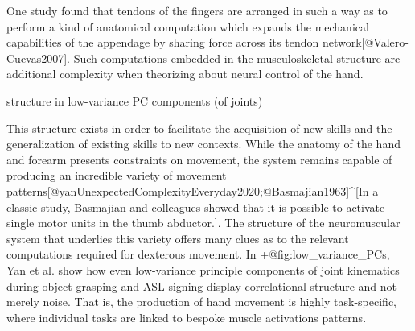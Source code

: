 \documentclass[../main.tex]{subfiles}
\begin{document}
 One study found that tendons of the fingers are arranged in such a way as to perform a kind of anatomical computation which expands the mechanical capabilities of the appendage by sharing force across its tendon network[@Valero-Cuevas2007]. Such computations embedded in the musculoskeletal structure are additional complexity when theorizing about neural control of the hand. 

 structure in low-variance PC components (of joints) 

This structure exists in order to facilitate the acquisition of new skills and the generalization of existing skills to new contexts. While the anatomy of the hand and forearm presents constraints on movement, the system remains capable of producing an incredible variety of movement patterns[@yanUnexpectedComplexityEveryday2020;@Basmajian1963]^[In a classic study, Basmajian and colleagues showed that it is possible to activate single motor units in the thumb abductor.]. The structure of the neuromuscular system that underlies this variety offers many clues as to the relevant computations required for dexterous movement. In {+@fig:low_variance_PCs}, Yan et al. show how even low-variance principle components of joint kinematics during object grasping and ASL signing display correlational structure and not merely noise. That is, the production of hand movement is highly task-specific, where individual tasks are linked to bespoke muscle activations patterns.
\end{document}
